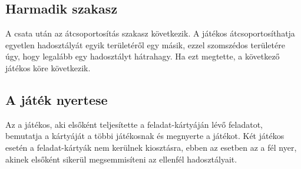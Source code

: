 \subsection*{Harmadik szakasz}

A csata után az átcsoportosítás szakasz következik. A játékos átcsoportosíthatja egyetlen hadosztályát egyik területéről egy másik, ezzel szomszédos területére úgy, hogy legalább egy hadosztályt hátrahagy. Ha ezt megtette, a következő játékos köre következik.

\subsection*{A játék nyertese} 

Az a játékos, aki elsőként teljesítette a feladat-kártyáján lévő feladatot, bemutatja a kártyáját a többi játékosnak és megnyerte a játékot. Két játékos esetén a feladat-kártyák nem kerülnek kiosztásra, ebben az esetben az a fél nyer, akinek elsőként sikerül megsemmisíteni az ellenfél hadosztályait.